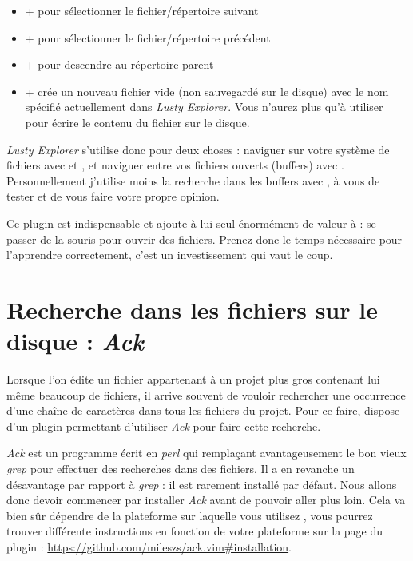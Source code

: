 \begin{itemize}
    \item \tctrl + \tn pour sélectionner le fichier/répertoire suivant
    \item \tctrl + \tp pour sélectionner le fichier/répertoire précédent
    \item \tctrl + \tw pour descendre au répertoire parent
    \item \tctrl + \te crée un nouveau fichier vide (non sauvegardé sur le disque) avec le nom spécifié actuellement dans \emph{Lusty Explorer}. Vous n'aurez plus qu'à utiliser  pour écrire le contenu du fichier sur le disque.
\end{itemize}

\emph{Lusty Explorer} s'utilise donc pour deux choses : naviguer sur votre système de fichiers avec  et , et naviguer entre vos fichiers ouverts (buffers) avec . Personnellement j'utilise moins la recherche dans les buffers avec , à vous de tester et de vous faire votre propre opinion.

Ce plugin est indispensable et ajoute à lui seul énormément de valeur à \vim : se passer de la souris pour ouvrir des fichiers. Prenez donc le temps nécessaire pour l'apprendre correctement, c'est un investissement qui vaut le coup.

\section{Recherche dans les fichiers sur le disque : \emph{Ack}}

Lorsque l'on édite un fichier appartenant à un projet plus gros contenant lui même beaucoup de fichiers, il arrive souvent de vouloir rechercher une occurrence d'une chaîne de caractères dans tous les fichiers du projet. Pour ce faire, \vim dispose d'un plugin permettant d'utiliser \emph{Ack} pour faire cette recherche.

\emph{Ack} est un programme écrit en \emph{perl} qui remplaçant avantageusement le bon vieux \emph{grep} pour effectuer des recherches dans des fichiers. Il a en revanche un désavantage par rapport à \emph{grep} : il est rarement installé par défaut. Nous allons donc devoir commencer par installer \emph{Ack} avant de pouvoir aller plus loin. Cela va bien sûr dépendre de la plateforme sur laquelle vous utilisez \vim, vous pourrez trouver différente instructions en fonction de votre plateforme sur la page du plugin : \url{https://github.com/mileszs/ack.vim#installation}.

